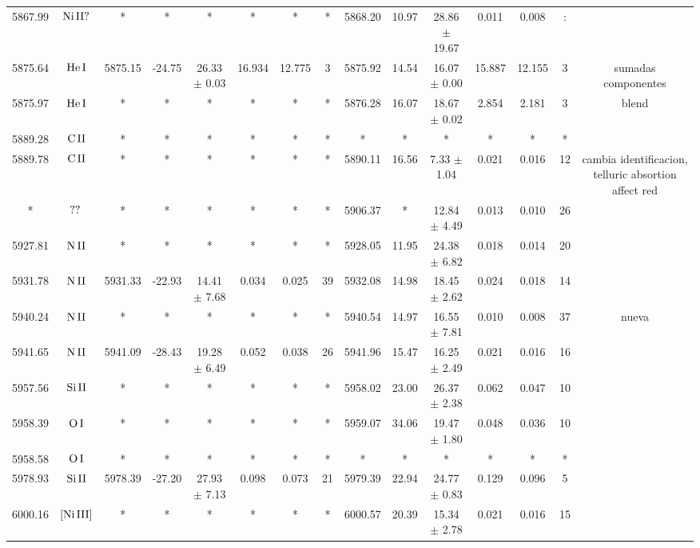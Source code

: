 \documentclass{article}
\begin{document}
\begin{table*}
\begin{adjustbox}{width=\textwidth}
\begin{tabular}{ccccccccccccccc}
5867.99 & $\mbox{Ni}\thinspace \mbox{II?}$ & * & * & * & * & * & * & 5868.20 & 10.97 & 28.86 $\pm$ 19.67 & 0.011 & 0.008 & : &  \\
5875.64 & $\mbox{He}\thinspace \mbox{I}$ & 5875.15 & -24.75 & 26.33 $\pm$ 0.03 & 16.934 & 12.775 & 3 & 5875.92 & 14.54 & 16.07 $\pm$ 0.00 & 15.887 & 12.155 & 3 &  sumadas componentes \\
5875.97 & $\mbox{He}\thinspace \mbox{I}$ & * & * & * & * & * & * & 5876.28 & 16.07 & 18.67 $\pm$ 0.02 & 2.854 & 2.181 & 3 &  blend \\
5889.28 & $\mbox{C}\thinspace \mbox{II}$ & * & * & * & * & * & * & * & * & * & * & * & * &  \\
5889.78 & $\mbox{C}\thinspace \mbox{II}$ & * & * & * & * & * & * & 5890.11 & 16.56 & 7.33 $\pm$ 1.04 & 0.021 & 0.016 & 12 &  cambia identificacion, telluric absortion affect red \\
* & $\mbox{??}\thinspace \mbox{}$ & * & * & * & * & * & * & 5906.37 & * & 12.84 $\pm$ 4.49 & 0.013 & 0.010 & 26 &  \\
5927.81 & $\mbox{N}\thinspace \mbox{II}$ & * & * & * & * & * & * & 5928.05 & 11.95 & 24.38 $\pm$ 6.82 & 0.018 & 0.014 & 20 &  \\
5931.78 & $\mbox{N}\thinspace \mbox{II}$ & 5931.33 & -22.93 & 14.41 $\pm$ 7.68 & 0.034 & 0.025 & 39 & 5932.08 & 14.98 & 18.45 $\pm$ 2.62 & 0.024 & 0.018 & 14 &  \\
5940.24 & $\mbox{N}\thinspace \mbox{II}$ & * & * & * & * & * & * & 5940.54 & 14.97 & 16.55 $\pm$ 7.81 & 0.010 & 0.008 & 37 &  nueva \\
5941.65 & $\mbox{N}\thinspace \mbox{II}$ & 5941.09 & -28.43 & 19.28 $\pm$ 6.49 & 0.052 & 0.038 & 26 & 5941.96 & 15.47 & 16.25 $\pm$ 2.49 & 0.021 & 0.016 & 16 &  \\
5957.56 & $\mbox{Si}\thinspace \mbox{II}$ & * & * & * & * & * & * & 5958.02 & 23.00 & 26.37 $\pm$ 2.38 & 0.062 & 0.047 & 10 &  \\
5958.39 & $\mbox{O}\thinspace \mbox{I}$ & * & * & * & * & * & * & 5959.07 & 34.06 & 19.47 $\pm$ 1.80 & 0.048 & 0.036 & 10 &  \\
5958.58 & $\mbox{O}\thinspace \mbox{I}$ & * & * & * & * & * & * & * & * & * & * & * & * &  \\
5978.93 & $\mbox{Si}\thinspace \mbox{II}$ & 5978.39 & -27.20 & 27.93 $\pm$ 7.13 & 0.098 & 0.073 & 21 & 5979.39 & 22.94 & 24.77 $\pm$ 0.83 & 0.129 & 0.096 & 5 &  \\
6000.16 & $\mbox{[Ni}\thinspace \mbox{III]}$ & * & * & * & * & * & * & 6000.57 & 20.39 & 15.34 $\pm$ 2.78 & 0.021 & 0.016 & 15 &  \\

\end{tabular}
\end{adjustbox}
\end{table*}
\end{document}
